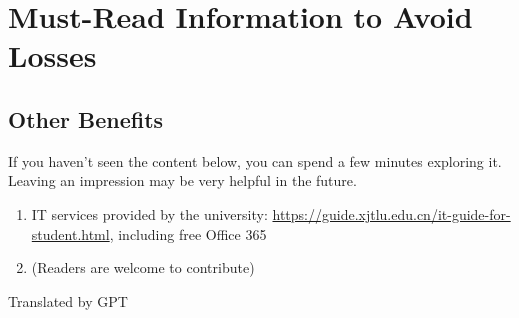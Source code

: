 
\chapter{Must-Read Information to Avoid Losses}
\label{fuli}






% 

\section{Other Benefits}

If you haven't seen the content below, you can spend a few minutes exploring it. Leaving an impression may be very helpful in the future.

\begin{enumerate}
    \item IT services provided by the university: \url{https://guide.xjtlu.edu.cn/it-guide-for-student.html}, including free Office 365
    \item (Readers are welcome to contribute)
\end{enumerate}

\begin{flushright}
    Translated by GPT
\end{flushright}
